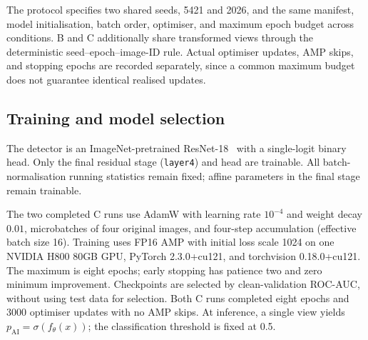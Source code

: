 The protocol specifies two shared seeds, 5421 and 2026, and the same
manifest, model initialisation, batch order, optimiser, and maximum epoch
budget across conditions. B and C additionally share transformed views
through the deterministic seed--epoch--image-ID rule. Actual optimiser
updates, AMP skips, and stopping epochs are recorded separately, since a
common maximum budget does not guarantee identical realised updates.

\subsection{Training and model selection}
\label{sec:wang-training}
The detector is an ImageNet-pretrained ResNet-18~\cite{wang_he2016} with a
single-logit binary head. Only the final residual stage (\texttt{layer4})
and head are trainable. All batch-normalisation running statistics remain
fixed; affine parameters in the final stage remain trainable.

The two completed C runs use AdamW with learning rate $10^{-4}$ and weight
decay $0.01$, microbatches of four original images, and four-step
accumulation (effective batch size 16). Training uses FP16 AMP with initial
loss scale 1024 on one NVIDIA H800 80GB GPU, PyTorch 2.3.0+cu121, and
torchvision 0.18.0+cu121. The maximum is eight epochs; early stopping has
patience two and zero minimum improvement. Checkpoints are selected by
clean-validation ROC-AUC, without using test data for selection. Both C
runs completed eight epochs and 3000 optimiser updates with no AMP skips.
At inference, a single view yields $p_{\mathrm{AI}}=\sigma(f_\theta(x))$;
the classification threshold is fixed at 0.5.
